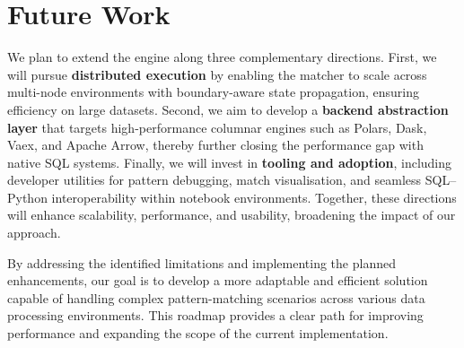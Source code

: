 \section{Future Work}
\label{sec:conc-future}

We plan to extend the engine along three complementary directions.
First, we will pursue \textbf{distributed execution} by enabling the
matcher to scale across multi-node environments with boundary-aware
state propagation, ensuring efficiency on large datasets.  Second, we
aim to develop a \textbf{backend abstraction layer} that targets
high-performance columnar engines such as Polars, Dask, Vaex, and
Apache Arrow, thereby further closing the performance gap with native
SQL systems.  Finally, we will invest in \textbf{tooling and adoption},
including developer utilities for pattern debugging, match
visualisation, and seamless SQL--Python interoperability within notebook
environments.  Together, these directions will enhance scalability,
performance, and usability, broadening the impact of our approach.

By addressing the identified limitations and implementing the planned
enhancements, our goal is to develop a more adaptable and efficient
solution capable of handling complex pattern-matching scenarios across
various data processing environments.  This roadmap provides a clear
path for improving performance and expanding the scope of the current
implementation.
